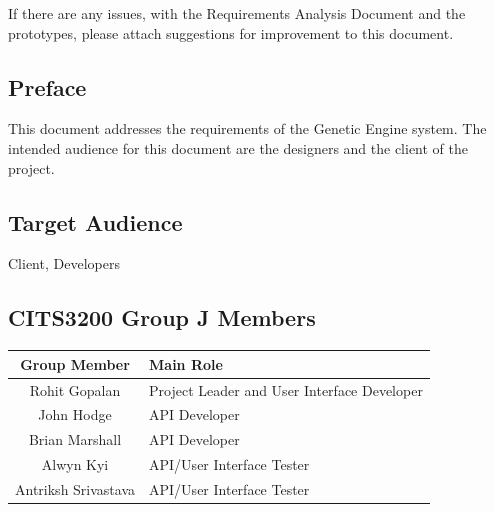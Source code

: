 If there are any issues, with the Requirements Analysis Document and the prototypes, please attach suggestions for improvement to this document.


\subsection*{Preface}
This document addresses the requirements of the Genetic Engine system. The intended audience for this document are the designers and the client of the project.

\subsection*{Target Audience}
Client, Developers

\subsection*{CITS3200 Group J Members}
\begin{tabular}{c l}
 Group Member & Main Role \\
 \hline \hline
 Rohit Gopalan & Project Leader and User Interface Developer \\ \hline
 John Hodge & API Developer \\ \hline
 Brian Marshall & API Developer \\ \hline
 Alwyn Kyi & API/User Interface Tester \\ \hline
 Antriksh Srivastava & API/User Interface Tester\\ \hline
\end{tabular}

